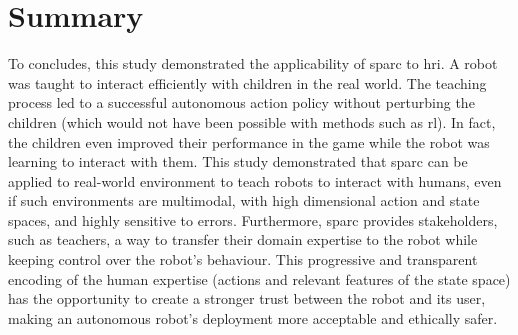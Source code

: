 

\section{Summary}

%
%
%
%

To concludes, this study demonstrated the applicability of \gls{sparc} to \gls{hri}. A robot was taught to interact efficiently with children in the real world. The teaching process led to a successful autonomous action policy without perturbing the children (which would not have been possible with methods such as \gls{rl}). In fact, the children even improved their performance in the game while the robot was learning to interact with them. This study demonstrated that \gls{sparc} can be applied to real-world environment to teach robots to interact with humans, even if such environments are multimodal, with high dimensional action and state spaces, and highly sensitive to errors. Furthermore, \gls{sparc} provides stakeholders, such as teachers, a way to transfer their domain expertise to the robot while keeping control over the robot's behaviour. This progressive and transparent encoding of the human expertise (actions and relevant features of the state space) has the opportunity to create a stronger trust between the robot and its user, making an autonomous robot's deployment more acceptable and ethically safer.

